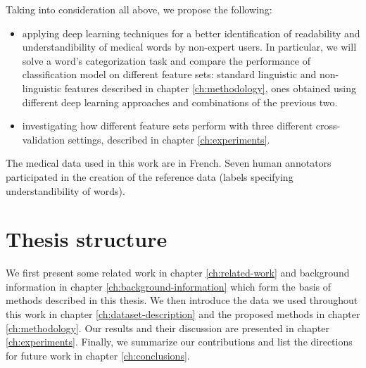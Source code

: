 Taking into consideration all above, we propose the following:
\begin{itemize}
    \item applying deep learning techniques for a better identification of readability and understandibility of medical words by non-expert users. In particular, we will solve a word's categorization task and compare the performance of classification model on different feature sets: standard linguistic and non-linguistic features described in  chapter \ref{ch:methodology}, ones obtained using different deep learning approaches and combinations of the previous two.
    \item investigating how different feature sets perform with three different cross-validation settings, described in chapter \ref{ch:experiments}. 
\end{itemize}
The medical data used in this work are in French. Seven human annotators participated in the creation of the reference data (labels specifying understandibility of words).


\section{Thesis structure}
We first present some related work in chapter \ref{ch:related-work} and background information in chapter \ref{ch:background-information} which form the basis of methods described in this thesis. We then introduce the data we used throughout this work in chapter \ref{ch:dataset-description} and the proposed methods in chapter \ref{ch:methodology}. Our results and their discussion are presented in chapter \ref{ch:experiments}. Finally, we summarize our contributions and list the directions for future work in chapter \ref{ch:conclusions}.